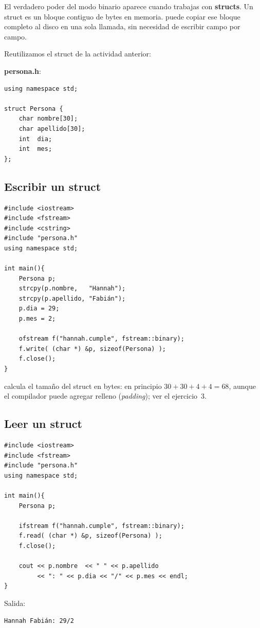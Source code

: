 \documentclass[12pt, oneside]{article}
\begin{document}
El verdadero poder del modo binario aparece cuando trabajas con
\textbf{structs}.  Un struct es un bloque contiguo de bytes en memoria.
 puede copiar ese bloque completo al disco en una sola llamada,
sin necesidad de escribir campo por campo.

Reutilizamos el struct de la actividad anterior:

\textbf{persona.h}:
\begin{verbatim}
using namespace std;

struct Persona {
    char nombre[30];
    char apellido[30];
    int  dia;
    int  mes;
};
\end{verbatim}

\subsection{Escribir un struct}

\begin{verbatim}
#include <iostream>
#include <fstream>
#include <cstring>
#include "persona.h"
using namespace std;

int main(){
    Persona p;
    strcpy(p.nombre,   "Hannah");
    strcpy(p.apellido, "Fabián");
    p.dia = 29;
    p.mes = 2;

    ofstream f("hannah.cumple", fstream::binary);
    f.write( (char *) &p, sizeof(Persona) );
    f.close();
}
\end{verbatim}

 calcula el tamaño del struct en bytes: en principio
$30 + 30 + 4 + 4 = 68$, aunque el compilador puede agregar relleno
(\textit{padding}); ver el ejercicio~3.

\subsection{Leer un struct}

\begin{verbatim}
#include <iostream>
#include <fstream>
#include "persona.h"
using namespace std;

int main(){
    Persona p;

    ifstream f("hannah.cumple", fstream::binary);
    f.read( (char *) &p, sizeof(Persona) );
    f.close();

    cout << p.nombre  << " " << p.apellido
         << ": " << p.dia << "/" << p.mes << endl;
}
\end{verbatim}

Salida:
\begin{verbatim}
Hannah Fabián: 29/2
\end{verbatim}
\end{document}
